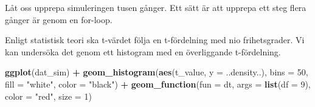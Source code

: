 \documentclass[
]{book}
\newenvironment{Shaded}{\begin{snugshade}}{\end{snugshade}}
\newcommand{\AttributeTok}[1]{\textcolor[rgb]{0.13,0.29,0.53}{#1}}
\newcommand{\ControlFlowTok}[1]{\textcolor[rgb]{0.13,0.29,0.53}{\textbf{#1}}}
\newcommand{\DecValTok}[1]{\textcolor[rgb]{0.00,0.00,0.81}{#1}}
\newcommand{\FunctionTok}[1]{\textcolor[rgb]{0.13,0.29,0.53}{\textbf{#1}}}
\newcommand{\NormalTok}[1]{#1}
\newcommand{\OtherTok}[1]{\textcolor[rgb]{0.56,0.35,0.01}{#1}}
\newcommand{\SpecialCharTok}[1]{\textcolor[rgb]{0.81,0.36,0.00}{\textbf{#1}}}
\newcommand{\StringTok}[1]{\textcolor[rgb]{0.31,0.60,0.02}{#1}}
\theoremstyle{definition}
\theoremstyle{definition}
\theoremstyle{definition}
\theoremstyle{definition}
\theoremstyle{remark}
\begin{document}
Låt oss upprepa simuleringen tusen gånger. Ett sätt är att upprepa ett steg flera gånger är genom en for-loop.

\begin{Shaded}
\end{Shaded}

Enligt statistisk teori ska t-värdet följa en t-fördelning med nio frihetsgrader. Vi kan undersöka det genom ett histogram med en överliggande t-fördelning.

\begin{Shaded}
\begin{Highlighting}[]
\FunctionTok{ggplot}\NormalTok{(dat\_sim) }\SpecialCharTok{+}
  \FunctionTok{geom\_histogram}\NormalTok{(}\FunctionTok{aes}\NormalTok{(t\_value, }\AttributeTok{y =}\NormalTok{ ..density..), }\AttributeTok{bins =} \DecValTok{50}\NormalTok{, }\AttributeTok{fill =} \StringTok{"white"}\NormalTok{, }\AttributeTok{color =} \StringTok{"black"}\NormalTok{) }\SpecialCharTok{+}
  \FunctionTok{geom\_function}\NormalTok{(}\AttributeTok{fun =}\NormalTok{ dt, }\AttributeTok{args =} \FunctionTok{list}\NormalTok{(}\AttributeTok{df =} \DecValTok{9}\NormalTok{), }\AttributeTok{color =} \StringTok{"red"}\NormalTok{, }\AttributeTok{size =} \DecValTok{1}\NormalTok{)}
\end{Highlighting}
\end{Shaded}
\end{document}
